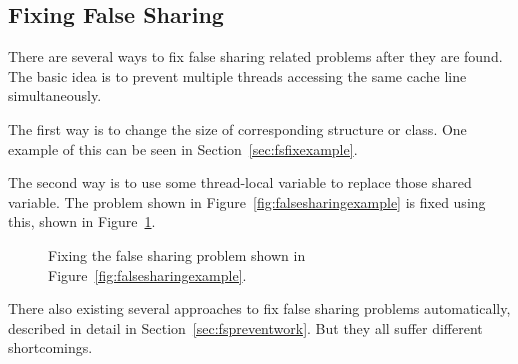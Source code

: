 \subsection{Fixing False Sharing}
There are several ways to fix false sharing related problems after they are found. The basic idea is to prevent multiple threads accessing the same cache line simultaneously.  

The first way is to change the size of corresponding structure or class. One example of this can be seen in Section~\ref{sec:fsfixexample}.

The second way is to use some thread-local variable to replace those shared variable.
The problem shown in Figure~\ref{fig:falsesharingexample} is fixed using this, shown in Figure~\ref{fig:falsesharingexamplefix}. 

\begin{figure}[!ht]
{\centering
\fbox{
\subfigure{}
}
\caption{Fixing the false sharing problem shown in Figure~\ref{fig:falsesharingexample}.
\label{fig:falsesharingexamplefix}}
}
\end{figure}

There also existing several approaches to fix false sharing problems automatically, described in detail in Section~\ref{sec:fspreventwork}. But they all suffer different shortcomings. 




